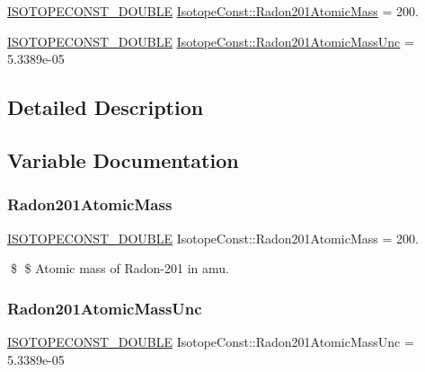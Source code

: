 \begin{DoxyCompactItemize}
\item 
\mbox{\hyperlink{group___isotope_const-_macros_ga8f45a7272ce02c0b4c65c44636ed719a}{I\+S\+O\+T\+O\+P\+E\+C\+O\+N\+S\+T\+\_\+\+D\+O\+U\+B\+LE}} \mbox{\hyperlink{group___isotope_const-_radon-_rn201_ga23c31cd4f9370b839be079a9dbe26c0b}{Isotope\+Const\+::\+Radon201\+Atomic\+Mass}} = 200.
\item 
\mbox{\hyperlink{group___isotope_const-_macros_ga8f45a7272ce02c0b4c65c44636ed719a}{I\+S\+O\+T\+O\+P\+E\+C\+O\+N\+S\+T\+\_\+\+D\+O\+U\+B\+LE}} \mbox{\hyperlink{group___isotope_const-_radon-_rn201_ga62d37c7d11d8f678a7dfa7e98881a399}{Isotope\+Const\+::\+Radon201\+Atomic\+Mass\+Unc}} = 5.\+3389e-\/05
\end{DoxyCompactItemize}


\subsection{Detailed Description}


\subsection{Variable Documentation}
\mbox{\label{group___isotope_const-_radon-_rn201_ga23c31cd4f9370b839be079a9dbe26c0b}} 
\subsubsection{\texorpdfstring{Radon201\+Atomic\+Mass}{Radon201AtomicMass}}
{\footnotesize\ttfamily \mbox{\hyperlink{group___isotope_const-_macros_ga8f45a7272ce02c0b4c65c44636ed719a}{I\+S\+O\+T\+O\+P\+E\+C\+O\+N\+S\+T\+\_\+\+D\+O\+U\+B\+LE}} Isotope\+Const\+::\+Radon201\+Atomic\+Mass = 200.}

\$ \$ Atomic mass of Radon-\/201 in amu. \mbox{\label{group___isotope_const-_radon-_rn201_ga62d37c7d11d8f678a7dfa7e98881a399}} 
\subsubsection{\texorpdfstring{Radon201\+Atomic\+Mass\+Unc}{Radon201AtomicMassUnc}}
{\footnotesize\ttfamily \mbox{\hyperlink{group___isotope_const-_macros_ga8f45a7272ce02c0b4c65c44636ed719a}{I\+S\+O\+T\+O\+P\+E\+C\+O\+N\+S\+T\+\_\+\+D\+O\+U\+B\+LE}} Isotope\+Const\+::\+Radon201\+Atomic\+Mass\+Unc = 5.\+3389e-\/05}

